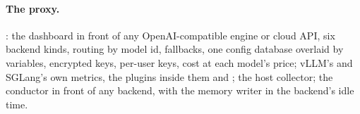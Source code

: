 \paragraph{The proxy.} : the dashboard in front of any OpenAI-compatible engine or cloud API, six backend kinds, routing by model id, fallbacks, one config database overlaid by  variables, encrypted keys, per-user keys, cost at each model's price; vLLM's and SGLang's own metrics, the plugins inside them and ; the host collector; the conductor in front of any backend, with the memory writer in the backend's idle time.
